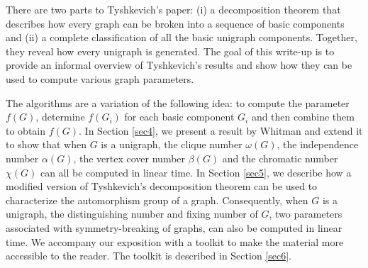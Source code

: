 \documentclass[11pt]{article}
\begin{document}


There are two parts to Tyshkevich's paper:  (i) a decomposition theorem that describes how every graph can be broken  into a sequence of basic components and   (ii) a complete classification of all the basic unigraph components. Together, they reveal how every unigraph is generated.   
The goal of this write-up is to provide an informal overview of Tyshkevich's  results and show how they can be used to compute various graph parameters.  

The algorithms are a variation of the following idea:  to compute the parameter $f(G)$,  determine $f(G_i)$ for each basic component $G_i$ and then combine them to obtain $f(G)$.   In Section \ref{sec4},  we present a result by Whitman \cite{Whitman24} and extend it to show that when $G$ is a unigraph,  the clique number $\omega(G)$, the independence number $\alpha(G)$, the vertex cover number $\beta(G)$ and the chromatic number $\chi(G)$ can all be computed in linear time.  In Section \ref{sec5},  we describe how a modified version of Tyshkevich's decomposition theorem can be used to characterize the automorphism group of a graph. Consequently, when $G$ is a unigraph, the distinguishing number and fixing number of $G$, two parameters associated with symmetry-breaking of graphs,  can also be computed in linear time.  We accompany our exposition with a toolkit to make the material more accessible to the reader.  The toolkit is described  in Section \ref{sec6}.






\end{document}
